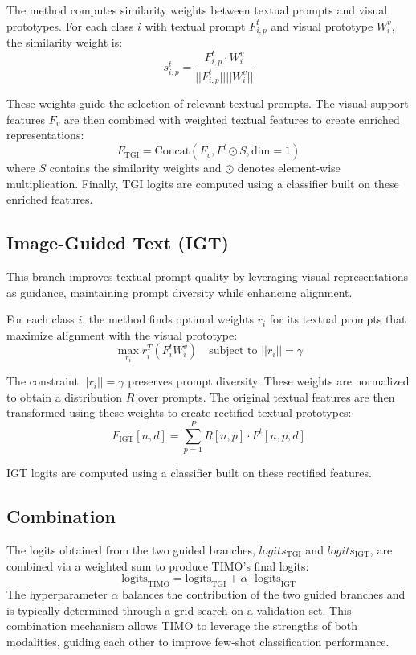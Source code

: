 \documentclass[conference,6pt]{IEEEtran}
\begin{document}
The method computes similarity weights between textual prompts and visual prototypes. For each class $i$ with textual prompt $F_{i,p}^t$ and visual prototype $W_i^v$, the similarity weight is:
\[
s_{i,p}^t = \frac{F_{i,p}^t \cdot W_i^v}{||F_{i,p}^t|| ||W_i^v||}
\]

These weights guide the selection of relevant textual prompts. The visual support features $F_v$ are then combined with weighted textual features to create enriched representations:
\[
F_{\text{TGI}} = \text{Concat}(F_v, F^t \odot S, \text{dim}=1)
\]
where $S$ contains the similarity weights and $\odot$ denotes element-wise multiplication. Finally, TGI logits are computed using a classifier built on these enriched features.

\subsection{Image-Guided Text (IGT)}
This branch improves textual prompt quality by leveraging visual representations as guidance, maintaining prompt diversity while enhancing alignment.

For each class $i$, the method finds optimal weights $r_i$ for its textual prompts that maximize alignment with the visual prototype:
\[
\max_{r_i} r_i^T (F_i^t W_i^v) \quad \text{subject to } ||r_i|| = \gamma
\]

The constraint $||r_i|| = \gamma$ preserves prompt diversity. These weights are normalized to obtain a distribution $R$ over prompts. The original textual features are then transformed using these weights to create rectified textual prototypes:
\[
F_{\text{IGT}}[n, d] = \sum_{p=1}^P R[n,p] \cdot F^t[n,p,d]
\]

IGT logits are computed using a classifier built on these rectified features.

\subsection{Combination}
The logits obtained from the two guided branches, $logits_{\text{TGI}}$ and $logits_{\text{IGT}}$, are combined via a weighted sum to produce TIMO's final logits:
\[
\text{logits}_{\text{TIMO}} = \text{logits}_{\text{TGI}} + \alpha \cdot \text{logits}_{\text{IGT}}
\]
The hyperparameter $\alpha$ balances the contribution of the two guided branches and is typically determined through a grid search on a validation set. This combination mechanism allows TIMO to leverage the strengths of both modalities, guiding each other to improve few-shot classification performance.
\end{document}
